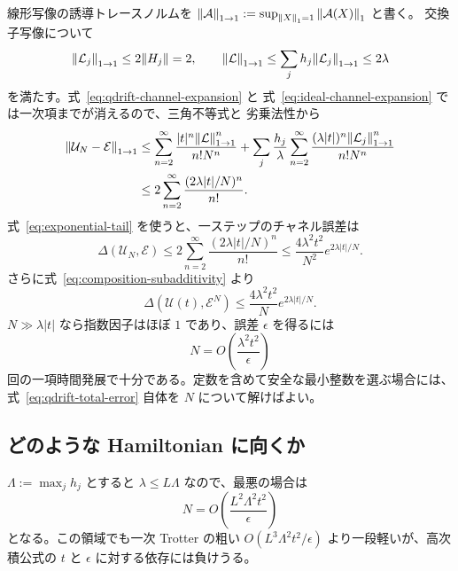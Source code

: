 \documentclass[uplatex,dvipdfmx,11pt,a4paper]{jsarticle}
\newcommand{\cE}{\mathcal{E}}
\newcommand{\cL}{\mathcal{L}}
\newcommand{\cU}{\mathcal{U}}
\newcommand{\chanerr}{\Delta}
\begin{document}
線形写像の誘導トレースノルムを
$\norm{\mathcal{A}}_{1\to1}
:=\sup_{\norm{X}_1=1}\norm{\mathcal{A}(X)}_1$ と書く。
交換子写像について
\begin{equation}
  \norm{\cL_j}_{1\to1}\leq2\norm{H_j}=2,
  \qquad
  \norm{\cL}_{1\to1}
  \leq\sum_jh_j\norm{\cL_j}_{1\to1}
  \leq2\lambda
  \label{eq:liouvillian-bounds}
\end{equation}
を満たす。式~\eqref{eq:qdrift-channel-expansion} と
式~\eqref{eq:ideal-channel-expansion} では一次項までが消えるので、三角不等式と
劣乗法性から
\begin{align}
  \norm{\cU_N-\cE}_{1\to1}
  &\leq
  \sum_{n=2}^{\infty}
    \frac{|t|^n\norm{\cL}_{1\to1}^n}{n!N^n}
  +\sum_j\frac{h_j}{\lambda}
    \sum_{n=2}^{\infty}
    \frac{(\lambda|t|)^n\norm{\cL_j}_{1\to1}^n}{n!N^n}\\
  &\leq
  2\sum_{n=2}^{\infty}
    \frac{(2\lambda|t|/N)^n}{n!}.
  \label{eq:qdrift-tail-before-distance}
\end{align}
式~\eqref{eq:exponential-tail} を使うと、一ステップのチャネル誤差は
\begin{equation}
  \chanerr(\cU_N,\cE)
  \leq
  2\sum_{n=2}^{\infty}\frac{(2\lambda|t|/N)^n}{n!}
  \leq
  \frac{4\lambda^2t^2}{N^2}
  e^{2\lambda|t|/N}.
  \label{eq:qdrift-one-step-error}
\end{equation}
さらに式~\eqref{eq:composition-subadditivity} より
\begin{equation}
  \chanerr(\cU(t),\cE^N)
  \leq
  \frac{4\lambda^2t^2}{N}
  e^{2\lambda|t|/N}.
  \label{eq:qdrift-total-error}
\end{equation}
$N\gg\lambda|t|$ なら指数因子はほぼ $1$ であり、誤差 $\epsilon$ を得るには
\begin{equation}
  N=O\left(\frac{\lambda^2t^2}{\epsilon}\right)
  \label{eq:qdrift-complexity}
\end{equation}
回の一項時間発展で十分である。定数を含めて安全な最小整数を選ぶ場合には、
式~\eqref{eq:qdrift-total-error} 自体を $N$ について解けばよい。

\subsection{どのような Hamiltonian に向くか}

$\Lambda:=\max_jh_j$ とすると $\lambda\leq L\Lambda$ なので、最悪の場合は
\begin{equation}
  N=O\left(\frac{L^2\Lambda^2t^2}{\epsilon}\right)
\end{equation}
となる。この領域でも一次 Trotter の粗い
$O(L^3\Lambda^2t^2/\epsilon)$ より一段軽いが、高次積公式の $t$ と
$\epsilon$ に対する依存には負けうる。
\end{document}
